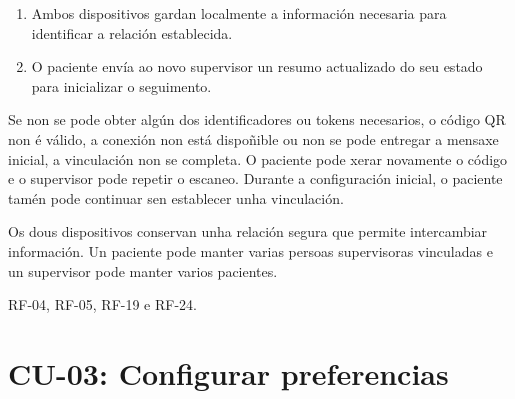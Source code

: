 \begin{description}
\begin{enumerate}
    \item Ambos dispositivos gardan localmente a información necesaria para
    identificar a relación establecida.

    \item O paciente envía ao novo supervisor un resumo actualizado do seu estado
    para inicializar o seguimento.
\end{enumerate}

\item[Fluxos alternativos:] Se non se pode obter algún dos identificadores ou
tokens necesarios, o código QR non é válido, a conexión non está dispoñible ou
non se pode entregar a mensaxe inicial, a vinculación non se completa. O
paciente pode xerar novamente o código e o supervisor pode repetir o escaneo.
Durante a configuración inicial, o paciente tamén pode continuar sen establecer
unha vinculación.

\item[Postcondicións:] Os dous dispositivos conservan unha relación segura que
permite intercambiar información. Un paciente pode manter varias persoas
supervisoras vinculadas e un supervisor pode manter varios pacientes.

\item[Requisitos relacionados:] RF-04, RF-05, RF-19 e RF-24.

\end{description}



\section{CU-03: Configurar preferencias}
\label{cu:configurar-preferencias}


